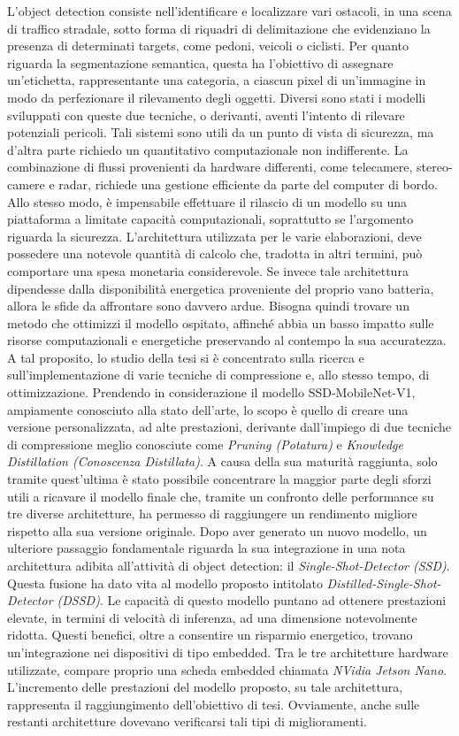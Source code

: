 L'object detection consiste nell'identificare e localizzare vari ostacoli, in una scena di traffico stradale, sotto forma di riquadri di delimitazione che evidenziano la presenza di determinati targets, come pedoni, veicoli o ciclisti. Per quanto riguarda la segmentazione semantica, questa ha l'obiettivo di assegnare un'etichetta, rappresentante una categoria, a ciascun pixel di un'immagine in modo da perfezionare il rilevamento degli oggetti. Diversi sono stati i modelli sviluppati con queste due tecniche, o derivanti, aventi l'intento di rilevare potenziali pericoli. Tali sistemi sono utili da un punto di vista di sicurezza, ma d'altra parte richiedo un quantitativo computazionale non indifferente. La combinazione di flussi provenienti da hardware differenti, come telecamere, stereo-camere e radar, richiede una gestione efficiente da parte del computer di bordo. Allo stesso modo, è impensabile effettuare il rilascio di un modello su una piattaforma a limitate capacità computazionali, soprattutto se l'argomento riguarda la sicurezza. L'architettura utilizzata per le varie elaborazioni, deve possedere una notevole quantità di calcolo che, tradotta in altri termini, può comportare una spesa monetaria considerevole. Se invece tale architettura dipendesse dalla disponibilità energetica proveniente del proprio vano batteria, allora le sfide da affrontare sono davvero ardue. Bisogna quindi trovare un metodo che ottimizzi il modello ospitato, affinché abbia un basso impatto sulle risorse computazionali e energetiche preservando al contempo la sua accuratezza. A tal proposito, lo studio della tesi si è concentrato sulla ricerca e sull'implementazione di varie tecniche di compressione e, allo stesso tempo, di ottimizzazione. Prendendo in considerazione il modello SSD-MobileNet-V1, ampiamente conosciuto alla stato dell'arte, lo scopo è quello di creare una versione personalizzata, ad alte prestazioni, derivante dall'impiego di due tecniche di compressione meglio conosciute come \emph{Pruning (Potatura)} e \emph{Knowledge Distillation (Conoscenza Distillata)}. 
A causa della sua maturità raggiunta, solo tramite quest'ultima è stato possibile concentrare la maggior parte degli sforzi utili a ricavare il modello finale che, tramite un confronto delle performance su tre diverse architetture, ha permesso di raggiungere un rendimento migliore rispetto alla sua versione originale. Dopo aver generato un nuovo modello, un ulteriore passaggio fondamentale riguarda la sua integrazione in una nota architettura adibita all'attività di object detection: il \emph{Single-Shot-Detector (SSD)}.
Questa fusione ha dato vita al modello proposto intitolato \emph{Distilled-Single-Shot-Detector (DSSD)}. Le capacità di questo modello puntano ad ottenere prestazioni elevate, in termini di velocità di inferenza, ad una dimensione notevolmente ridotta. Questi benefici, oltre a consentire un risparmio energetico, trovano un'integrazione nei dispositivi di tipo embedded. Tra le tre architetture hardware utilizzate, compare proprio una scheda embedded chiamata \emph{NVidia Jetson Nano}.
L'incremento delle prestazioni del modello proposto, su tale architettura, rappresenta il raggiungimento dell'obiettivo di tesi. Ovviamente, anche sulle restanti architetture dovevano verificarsi tali tipi di miglioramenti. 

